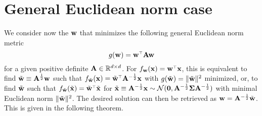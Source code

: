 \documentclass[11pt]{article}
\begin{document}
\section{General Euclidean norm case}

We consider now the $\mathbf w$ that minimizes the following general Euclidean norm metric
\[
  g(\w) = \w^\top \A \w
\]
for a given positive definite $\mathbf A \in \mathbb R^{d \times d}$. For $f_\w(\x) = \w^\top \x$, this is equivalent to find $\tilde {\mathbf w} \equiv \mathbf A^{\frac12} \mathbf w$ such that $f_{\tilde \w} (\x) = \tilde \w^\top \A^{-\frac12} \x$ with $g(\tilde {\mathbf w}) = \| \tilde {\mathbf w} \|^2$ minimized, or, to find $\tilde {\mathbf w}$ such that $f_{\tilde \w} (\tilde \x) = \tilde \w^\top \tilde \x$ for $\tilde {\mathbf x} \equiv \mathbf A^{-\frac12} \mathbf x \sim \mathcal{N} (\mathbf 0, \mathbf A^{-\frac12} \mathbf{\Sigma} \mathbf A^{-\frac12} )$ with minimal Euclidean norm $\| \tilde {\mathbf w} \|^2$. The desired solution can then be retrieved as $\mathbf w = \mathbf A^{-\frac12} \tilde {\mathbf w}$. This is given in the following theorem.
\end{document}
